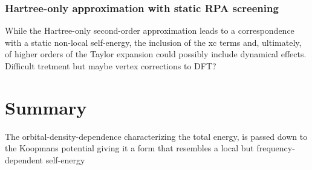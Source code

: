 \subsubsection*{Hartree-only approximation with static RPA screening}


While the Hartree-only second-order approximation leads to a correspondence with a static non-local self-energy, the inclusion of the xc terms and, ultimately, of higher orders of the Taylor expansion could possibly include dynamical effects. Difficult tretment but maybe vertex corrections to DFT?


\clearpage
\section{Summary\label{sec:ch3-summary}}
The orbital-density-dependence characterizing the total energy, is passed down to the Koopmans potential giving it a form that resembles a local but frequency-dependent self-energy